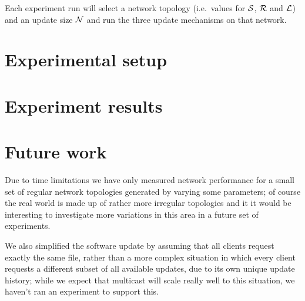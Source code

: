 \documentclass[a4paper,12pt]{article}
\begin{document}
Each experiment run will select a network topology (i.e.\ values
for ${\cal S}$, ${\cal R}$ and ${\cal L}$) and an update size
${\cal N}$ and run the three update mechanisms on that network.

\section{Experimental setup}
\label{experiment}

\section{Experiment results}
\label{results}

\section{Future work}
\label{future}

Due to time limitations we have only measured network performance
for a small set of regular network topologies generated by varying
some parameters; of course the real world is made up of rather
more irregular topologies and it it would be interesting to investigate
more variations in this area in a future set of experiments.

We also simplified the software update by assuming that all clients
request exactly the same file, rather than a more complex situation
in which every client requests a different subset of all available
updates, due to its own unique update history; while we expect that
multicast will scale really well to this situation, we haven't
ran an experiment to support this.
\end{document}
